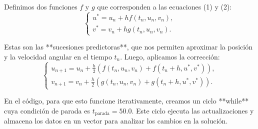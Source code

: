 \documentclass{article}
\begin{document}
Definimos dos funciones $f$ y $g$ que corresponden a las ecuaciones (1) y (2):
\begin{equation}
    \begin{cases}
        u^* = u_n + h f(t_n, u_n, v_n),  \\
        v^* = v_n + h g(t_n, u_n, v_n).
    \end{cases}
\end{equation}

Estas son las **sucesiones predictoras**, que nos permiten aproximar la posición y la velocidad angular en el tiempo $t_n$. Luego, aplicamos la corrección:
\begin{equation}
    \begin{cases}
        u_{n+1} = u_n + \frac{h}{2} \left( f(t_n, u_n, v_n) + f(t_n + h, u^*, v^*) \right),  \\
        v_{n+1} = v_n + \frac{h}{2} \left( g(t_n, u_n, v_n) + g(t_n + h, u^*, v^*) \right).
    \end{cases}
\end{equation}

En el código, para que esto funcione iterativamente, creamos un ciclo **while** cuya condición de parada es $t_{\text{parada}} = 50.0$. Este ciclo ejecuta las actualizaciones y almacena los datos en un vector para analizar los cambios en la solución.
\end{document}
